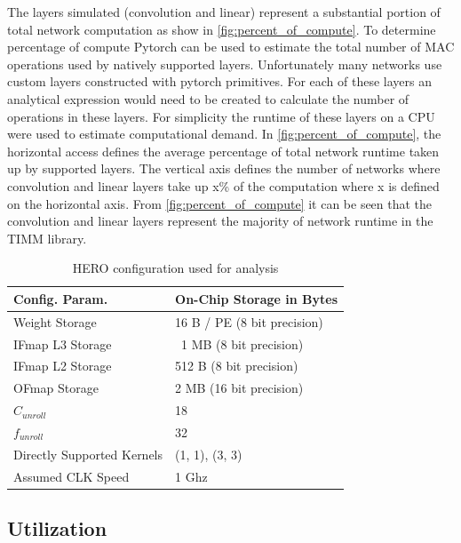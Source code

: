 The layers simulated (convolution and linear) represent a substantial portion of
total network computation as show in \autoref{fig:percent_of_compute}. 
To determine percentage of compute Pytorch can be used to estimate the
total number of MAC operations used by natively supported layers. Unfortunately
many networks use custom layers constructed with pytorch primitives. For
each of these layers an analytical expression would need to be created to calculate
the number of operations in these layers. For simplicity the runtime
of these layers on a CPU were used to estimate computational demand. In
\autoref{fig:percent_of_compute}, the horizontal access defines the average
percentage of total network runtime taken up by supported layers. The vertical
axis defines the number of networks where convolution and linear layers take up
x\% of the computation where x is defined on the horizontal axis. From
\autoref{fig:percent_of_compute} it can be seen that the convolution and linear
layers represent the majority of network runtime in the TIMM library. 

\begin{table}[]
    \center
    \begin{tabular}{|l|l|}
    \toprule
    Config. Param. & On-Chip Storage in Bytes    \\ 
    \midrule
    Weight Storage            & 16 B / PE (8 bit precision)  \\ \hline
    IFmap L3 Storage          & ~1 MB (8 bit precision)   \\ \hline
    IFmap L2 Storage          & 512 B (8 bit precision)   \\ \hline
    OFmap Storage             & 2 MB (16 bit precision)   \\ \hline
    $C_{unroll}$              & 18   \\ \hline
    $f_{unroll}$              & 32   \\ \hline
    Directly Supported Kernels             & {(1, 1), (3, 3)}   \\ \hline
    Assumed CLK Speed             & 1 Ghz   \\ \hline
\end{tabular}
\caption{HERO configuration used for analysis}
\label{tab:hero_config}
\end{table}

\subsection{Utilization}
\label{chap:hero:results:utilization}

